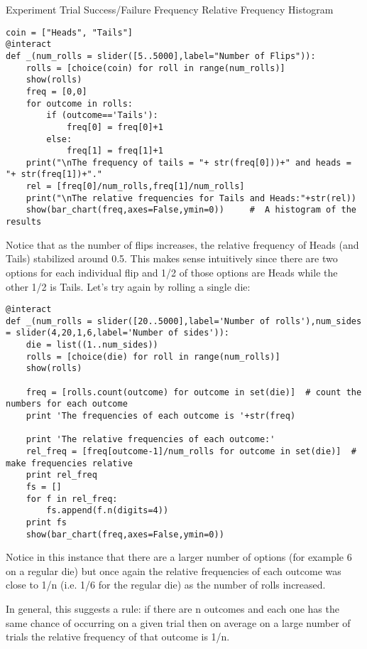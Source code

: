 \documentclass[10pt,]{book}
\theoremstyle{plain}
\theoremstyle{definition}
\theoremstyle{definition}
\numberwithin{equation}{section}
\begin{document}
	Experiment
	Trial
	Success/Failure
	Frequency
	Relative Frequency
	Histogram
\begin{lstlisting}[style=sageinput]
coin = ["Heads", "Tails"]
@interact
def _(num_rolls = slider([5..5000],label="Number of Flips")):
	rolls = [choice(coin) for roll in range(num_rolls)]
	show(rolls)   
	freq = [0,0]
	for outcome in rolls:
		if (outcome=='Tails'):
			freq[0] = freq[0]+1
		else:
			freq[1] = freq[1]+1
	print("\nThe frequency of tails = "+ str(freq[0]))+" and heads = "+ str(freq[1])+"."
	rel = [freq[0]/num_rolls,freq[1]/num_rolls]
	print("\nThe relative frequencies for Tails and Heads:"+str(rel))
	show(bar_chart(freq,axes=False,ymin=0))     #  A histogram of the results
\end{lstlisting}
\par
Notice that as the number of flips increases, the relative frequency of Heads (and Tails)
	stabilized around 0.5. This makes sense intuitively since there are two options for each 
	individual flip and 1/2 of those options are Heads while the other 1/2 is Tails. Let's try again
	by rolling a single die:%
\begin{lstlisting}[style=sageinput]
@interact
def _(num_rolls = slider([20..5000],label='Number of rolls'),num_sides = slider(4,20,1,6,label='Number of sides')):
	die = list((1..num_sides))
	rolls = [choice(die) for roll in range(num_rolls)]
	show(rolls)   

	freq = [rolls.count(outcome) for outcome in set(die)]  # count the numbers for each outcome
	print 'The frequencies of each outcome is '+str(freq)

	print 'The relative frequencies of each outcome:'
	rel_freq = [freq[outcome-1]/num_rolls for outcome in set(die)]  # make frequencies relative
	print rel_freq
	fs = []
	for f in rel_freq:
		fs.append(f.n(digits=4))
	print fs
	show(bar_chart(freq,axes=False,ymin=0))
\end{lstlisting}
\par
Notice in this instance that there are a larger number of options (for example 6 on a regular
	die) but once again the relative frequencies of each  outcome was close to 1/n (i.e. 1/6 for the regular die)
	as the number of rolls increased.%
\par
In general, this suggests a rule: if there are n outcomes and each one has the same
	chance of occurring on a given trial then on average on a large number of trials the relative
	frequency of that outcome is 1/n.%
\end{document}
